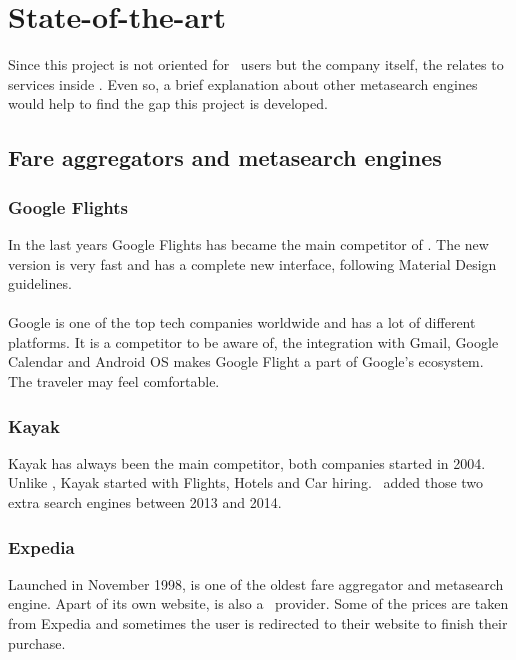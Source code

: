 
\chapter{State-of-the-art}

\label{chapter02}

Since this project is not oriented for \company\ users but the company itself, the \textit{} relates to services inside \company. Even so, a brief explanation about other metasearch engines would help to find the gap this project is developed.


\section{Fare aggregators and metasearch engines}

\subsection{Google Flights}

In the last years Google Flights has became the main competitor of \company. The new version is very fast and has a complete new interface, following Material Design guidelines.
\\\\
Google is one of the top tech companies worldwide and has a lot of different platforms. It is a competitor to be aware of, the integration with Gmail, Google Calendar and Android OS makes Google Flight a part of Google's ecosystem. The traveler may feel comfortable.

\subsection{Kayak}

Kayak has always been the main competitor, both companies started in 2004. Unlike \company, Kayak started with Flights, Hotels and Car hiring. \company\ added those two extra search engines between 2013 and 2014.

\subsection{Expedia}

Launched in November 1998, is one of the oldest fare aggregator and metasearch engine. Apart of its own website, is also a \company\ provider. Some of the prices are taken from Expedia and sometimes the user is redirected to their website to finish their purchase.

